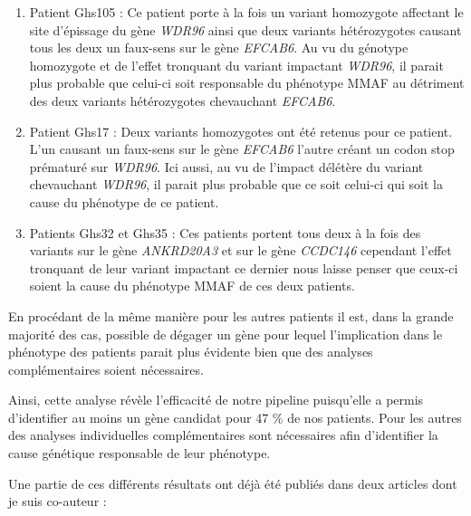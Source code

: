 \documentclass[12pt,twoside]{reedthesis}
\providecommand{\tightlist}{%
  \setlength{\itemsep}{0pt}\setlength{\parskip}{0pt}}
\theoremstyle{definition}
\theoremstyle{definition}
\theoremstyle{remark}
\begin{document}
  \begin{enumerate}
  \def\labelenumi{\arabic{enumi}.}
  \tightlist
  \item
    Patient Ghs105 : Ce patient porte à la fois un variant homozygote
    affectant le site d'épissage du gène \emph{WDR96} ainsi que deux
    variants hétérozygotes causant tous les deux un faux-sens sur le gène
    \emph{EFCAB6}. Au vu du génotype homozygote et de l'effet tronquant du
    variant impactant \emph{WDR96}, il parait plus probable que celui-ci
    soit responsable du phénotype MMAF au détriment des deux variants
    hétérozygotes chevauchant \emph{EFCAB6}.\\
  \item
    Patient Ghs17 : Deux variants homozygotes ont été retenus pour ce
    patient. L'un causant un faux-sens sur le gène \emph{EFCAB6} l'autre
    créant un codon stop prématuré sur \emph{WDR96}. Ici aussi, au vu de
    l'impact délétère du variant chevauchant \emph{WDR96}, il parait plus
    probable que ce soit celui-ci qui soit la cause du phénotype de ce
    patient.\\
  \item
    Patients Ghs32 et Ghs35 : Ces patients portent tous deux à la fois des
    variants sur le gène \emph{ANKRD20A3} et sur le gène \emph{CCDC146}
    cependant l'effet tronquant de leur variant impactant ce dernier nous
    laisse penser que ceux-ci soient la cause du phénotype MMAF de ces
    deux patients.
  \end{enumerate}
  
  En procédant de la même manière pour les autres patients il est, dans la
  grande majorité des cas, possible de dégager un gène pour lequel
  l'implication dans le phénotype des patients parait plus évidente bien
  que des analyses complémentaires soient nécessaires.
  
  Ainsi, cette analyse révèle l'efficacité de notre pipeline puisqu'elle a
  permis d'identifier au moins un gène candidat pour 47 \% de nos
  patients. Pour les autres des analyses individuelles complémentaires
  sont nécessaires afin d'identifier la cause génétique responsable de
  leur phénotype.
  
  Une partie de ces différents résultats ont déjà été publiés dans deux
  articles dont je suis co-auteur :
  
\end{document}
